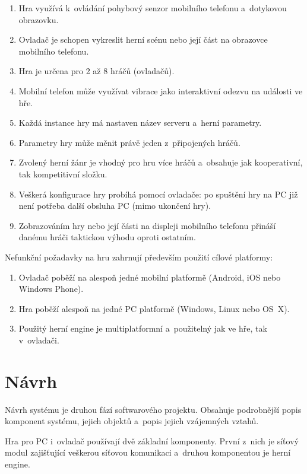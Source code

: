 \documentclass[thesis=B,czech,hidelinks]{FITthesis}[2012/06/26] %
\begin{document}
\begin{enumerate}
	\item Hra využívá k~ovládání pohybový senzor mobilního telefonu a~dotykovou obrazovku.
	\item Ovladač je schopen vykreslit herní scénu nebo její část na obrazovce mobilního telefonu.
	\item Hra je určena pro 2 až 8 hráčů (ovladačů).
	\item Mobilní telefon může využívat vibrace jako interaktivní odezvu na události ve hře.
 	\item Každá instance hry má nastaven název serveru a~herní parametry.
	\item Parametry hry může měnit právě jeden z~připojených hráčů.
	\item Zvolený herní žánr je vhodný pro hru více hráčů a~obsahuje jak kooperativní, tak kompetitivní složku.
	\item Veškerá konfigurace hry probíhá pomocí ovladače: po spuštění hry na PC již není potřeba další obsluha PC (mimo ukončení hry).
	\item Zobrazováním hry nebo její části na displeji mobilního telefonu přináší danému hráči taktickou výhodu oproti ostatním.

\end{enumerate}

Nefunkční požadavky na hru zahrnují především použití cílové platformy:

\begin{enumerate}
	\item Ovladač poběží na alespoň jedné mobilní platformě (Android, iOS nebo Windows Phone).
	\item Hra poběží alespoň na jedné PC platformě (Windows, Linux nebo OS~X).
	\item Použitý herní engine je multiplatformní a~použitelný jak ve hře, tak v~ovladači.
\end{enumerate}

\section{Návrh}

Návrh systému je druhou fází softwarového projektu. Obsahuje podrobnější popis komponent systému, jejich objektů a~popis jejich vzájemných vztahů.

Hra pro PC i~ovladač používají dvě základní komponenty. První z~nich je síťový modul zajišťující veškerou síťovou komunikaci a~druhou komponentou je herní engine. 
\end{document}
